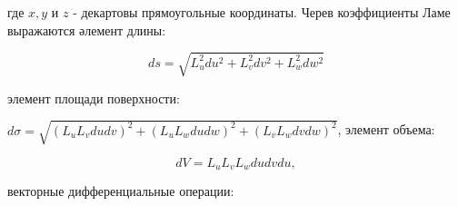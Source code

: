 \documentclass[10pt]{article}
\begin{document}
где $x, y$ и $z$ - декартовы прямоугольные координаты. Черев коэффициенты Ламе выражаются әлемент длины:



\[

d s=\sqrt{L_{u}^{2} d u^{2}+L_{v}^{2} d v^{2}+L_{w}^{2} d w^{2}}

\]



элемент площади поверхности:



$d \sigma=\sqrt{\left(L_{u} L_{v} d u d v\right)^{2}+\left(L_{u} L_{w} d u d w\right)^{2}+\left(L_{v} L_{w} d v d w\right)^{2}}$, элемент объема:



\[

d V=L_{u} L_{v} L_{w} d u d v d u,

\]



векторные дифференциальные операции:
\end{document}
